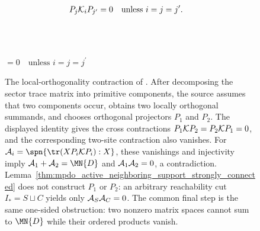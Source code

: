 \begin{figure}[ht]
    \centering
    \begin{align}
        P_j\mathcal K_iP_{j^\prime}
         & =0\quad\text{unless }i=j=j^\prime.
        \notag
    \end{align}
    \begin{center}
        \tenkzkernel
        \begin{tenkz}[rows={op,op,op}, cols=1, physical=updown]
             \\
             \\
        \end{tenkz}
        $ = 0\quad\text{unless }i=j=j^\prime$
    \end{center}
    \caption{The local-orthogonality contraction of
    \cite[Appendix~C.2, lines~1457--1470]{Cirac2016MPDO_arXiv}. After
    decomposing the sector trace matrix into primitive components, the source
    assumes that two components occur, obtains two locally orthogonal
    summands, and chooses orthogonal projectors $P_1$ and $P_2$. The
    displayed identity gives the cross contractions
    $P_1{\cal K}P_2=P_2{\cal K}P_1=0$, and the corresponding two-site
    contraction also vanishes. For
    ${\cal A}_i=\spn\{\tr(XP_i{\cal K}P_i):X\}$, these vanishings and
    injectivity imply
    ${\cal A}_1+{\cal A}_2=\MN{D}$ and
    ${\cal A}_1{\cal A}_2=0$, a contradiction.
    Lemma~\ref{thm:mpdo_active_neighboring_support_strongly_connected} does
    not construct $P_1$ or $P_2$: an arbitrary reachability cut
    $I_*=S\sqcup C$ yields only ${\cal A}_S{\cal A}_C=0$. The common final
    step is the same one-sided obstruction: two nonzero matrix spaces cannot
    sum to $\MN{D}$ while their ordered products vanish.}
    \label{fig:mpdo_local_orthogonality}
\end{figure}

